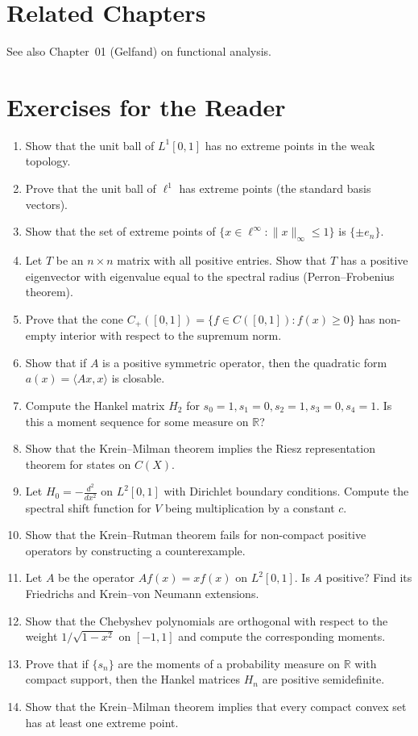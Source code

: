 \section{Related Chapters}
See also Chapter~01 (Gelfand) on functional analysis.

\section*{Exercises for the Reader}

\begin{enumerate}
    \item [I] Show that the unit ball of $L^1[0,1]$ has no extreme points in the weak topology.
    \item [B] Prove that the unit ball of $\ell^1$ has extreme points (the standard basis vectors).
    \item [B] Show that the set of extreme points of $\{x \in \ell^\infty : \|x\|_\infty \leq 1\}$ is $\{\pm e_n\}$.
    \item [I] Let $T$ be an $n \times n$ matrix with all positive entries. Show that $T$ has a positive eigenvector with eigenvalue equal to the spectral radius (Perron--Frobenius theorem).
    \item [B] Prove that the cone $C_+([0,1]) = \{f \in C([0,1]) : f(x) \geq 0\}$ has non-empty interior with respect to the supremum norm.
    \item [I] Show that if $A$ is a positive symmetric operator, then the quadratic form $a(x) = \langle Ax, x\rangle$ is closable.
    \item [I] Compute the Hankel matrix $H_2$ for $s_0 = 1, s_1 = 0, s_2 = 1, s_3 = 0, s_4 = 1$. Is this a moment sequence for some measure on $\mathbb{R}$?
    \item [A] Show that the Krein--Milman theorem implies the Riesz representation theorem for states on $C(X)$.
    \item [A] Let $H_0 = -\frac{d^2}{dx^2}$ on $L^2[0,1]$ with Dirichlet boundary conditions. Compute the spectral shift function for $V$ being multiplication by a constant $c$.
    \item [I] Show that the Krein--Rutman theorem fails for non-compact positive operators by constructing a counterexample.
    \item [A] Let $A$ be the operator $Af(x) = x f(x)$ on $L^2[0,1]$. Is $A$ positive? Find its Friedrichs and Krein--von Neumann extensions.
    \item [I] Show that the Chebyshev polynomials are orthogonal with respect to the weight $1/\sqrt{1-x^2}$ on $[-1,1]$ and compute the corresponding moments.
    \item [I] Prove that if $\{s_n\}$ are the moments of a probability measure on $\mathbb{R}$ with compact support, then the Hankel matrices $H_n$ are positive semidefinite.
    \item [B] Show that the Krein--Milman theorem implies that every compact convex set has at least one extreme point.
\end{enumerate}

